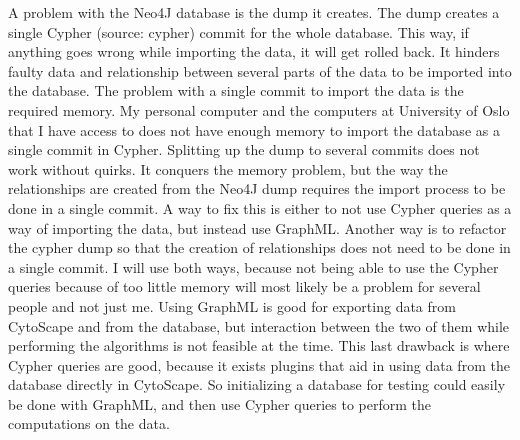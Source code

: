 \documentclass[UKenglish]{ifimaster}
\begin{document}
A problem with the Neo4J database is the dump it creates. The dump creates a single Cypher (source: cypher) commit for
the whole database. This way, if anything goes wrong while importing the data, it will get rolled back. It hinders
faulty data and relationship between several parts of the data to be imported into the database. The problem with a
single commit to import the data is the required memory. My personal computer and the computers at University of Oslo
that I have access to does not have enough memory to import the database as a single commit in Cypher. Splitting up the
dump to several commits does not work without quirks. It conquers the memory problem, but the way the relationships
are created from the Neo4J dump requires the import process to be done in a single commit. A way to fix this is either
to not use Cypher queries as a way of importing the data, but instead use GraphML. Another way is to refactor the cypher
dump so that the creation of relationships does not need to be done in a single commit. I will use both ways, because
not being able to use the Cypher queries because of too little memory will most likely be a problem for several people
and not just me. Using GraphML is good for exporting data from CytoScape and from the database, but interaction between
the two of them while performing the algorithms is not feasible at the time. This last drawback is where Cypher queries
are good, because it exists plugins that aid in using data from the database directly in CytoScape. So initializing a
database for testing could easily be done with GraphML, and then use Cypher queries to perform the computations on the
data.
\end{document}
